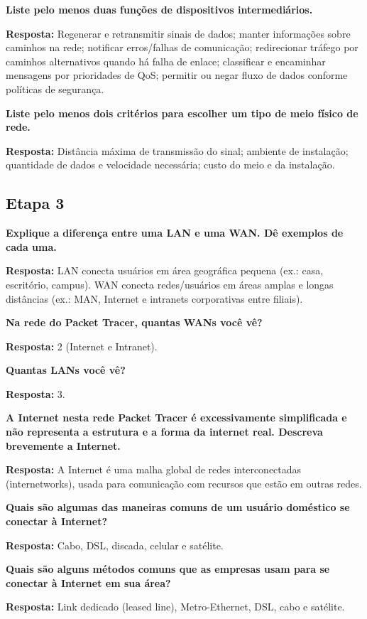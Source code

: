 \documentclass[12pt,a4paper]{article}
\newcommand{\resposta}[1]{\textbf{Resposta:} #1}
\begin{document}
\vspace{0.8em}
\noindent\textbf{Liste pelo menos duas funções de dispositivos intermediários.}

\resposta{Regenerar e retransmitir sinais de dados; manter informações sobre caminhos na rede; notificar erros/falhas de comunicação; redirecionar tráfego por caminhos alternativos quando há falha de enlace; classificar e encaminhar mensagens por prioridades de QoS; permitir ou negar fluxo de dados conforme políticas de segurança.}

\vspace{0.8em}
\noindent\textbf{Liste pelo menos dois critérios para escolher um tipo de meio físico de rede.}

\resposta{Distância máxima de transmissão do sinal; ambiente de instalação; quantidade de dados e velocidade necessária; custo do meio e da instalação.}

\subsection*{Etapa 3}
\noindent\textbf{Explique a diferença entre uma LAN e uma WAN. Dê exemplos de cada uma.}

\resposta{LAN conecta usuários em área geográfica pequena (ex.: casa, escritório, campus). WAN conecta redes/usuários em áreas amplas e longas distâncias (ex.: MAN, Internet e intranets corporativas entre filiais).}

\vspace{0.8em}
\noindent\textbf{Na rede do Packet Tracer, quantas WANs você vê?}

\resposta{2 (Internet e Intranet).}

\vspace{0.8em}
\noindent\textbf{Quantas LANs você vê?}

\resposta{3.}

\vspace{0.8em}
\noindent\textbf{A Internet nesta rede Packet Tracer é excessivamente simplificada e não representa a estrutura e a forma da internet real. Descreva brevemente a Internet.}

\resposta{A Internet é uma malha global de redes interconectadas (internetworks), usada para comunicação com recursos que estão em outras redes.}

\vspace{0.8em}
\noindent\textbf{Quais são algumas das maneiras comuns de um usuário doméstico se conectar à Internet?}

\resposta{Cabo, DSL, discada, celular e satélite.}

\vspace{0.8em}
\noindent\textbf{Quais são alguns métodos comuns que as empresas usam para se conectar à Internet em sua área?}

\resposta{Link dedicado (leased line), Metro-Ethernet, DSL, cabo e satélite.}
\end{document}
